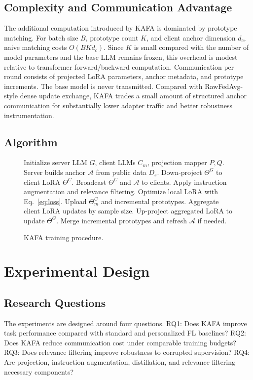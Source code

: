 \documentclass[conference]{IEEEtran}
\begin{document}
\subsection{Complexity and Communication Advantage}
The additional computation introduced by KAFA is dominated by prototype matching. For batch size $B$, prototype count $K$, and client anchor dimension $d_c$, naive matching costs $O(BKd_c)$. Since $K$ is small compared with the number of model parameters and the base LLM remains frozen, this overhead is modest relative to transformer forward/backward computation. Communication per round consists of projected LoRA parameters, anchor metadata, and prototype increments. The base model is never transmitted. Compared with RawFedAvg-style dense update exchange, KAFA trades a small amount of structured anchor communication for substantially lower adapter traffic and better robustness instrumentation.

\subsection{Algorithm}
\begin{figure}[t]
\begin{minipage}{0.98\linewidth}
\small
\begin{algorithmic}[1]
\STATE Initialize server LLM $G$, client LLMs $C_m$, projection mapper $P,Q$.
\STATE Server builds anchor $\mathcal{A}$ from public data $D_s$.
    \STATE Down-project $\Theta^G$ to client LoRA $\Theta^C$.
    \STATE Broadcast $\Theta^C$ and $\mathcal{A}$ to clients.
        \STATE Apply instruction augmentation and relevance filtering.
        \STATE Optimize local LoRA with Eq.~\eqref{eq:loss}.
        \STATE Upload $\Theta_m^C$ and incremental prototypes.
    \ENDFOR
    \STATE Aggregate client LoRA updates by sample size.
    \STATE Up-project aggregated LoRA to update $\Theta^G$.
    \STATE Merge incremental prototypes and refresh $\mathcal{A}$ if needed.
\ENDFOR
\end{algorithmic}
\end{minipage}
\caption{KAFA training procedure.}
\label{alg:kafa}
\end{figure}

\section{Experimental Design}
\subsection{Research Questions}
The experiments are designed around four questions. RQ1: Does KAFA improve task performance compared with standard and personalized FL baselines? RQ2: Does KAFA reduce communication cost under comparable training budgets? RQ3: Does relevance filtering improve robustness to corrupted supervision? RQ4: Are projection, instruction augmentation, distillation, and relevance filtering necessary components?
\end{document}
